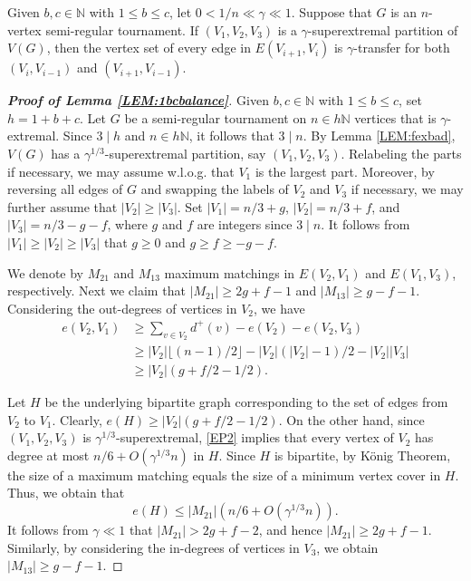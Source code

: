\documentclass[10pt,a4paper]{amsart}
\begin{document}
\begin{lemma}\label{LEM-edgegood}
    Given $b,c\in\mathbb{N}$ with $1\leqslant b\leqslant c$, let $0<1/n\ll\gamma\ll 1$. Suppose that $G$ is an $n$-vertex semi-regular tournament. If $(V_1,V_2,V_3)$ is a $\gamma$-superextremal partition of $V(G)$, then the vertex set of every edge in $E(V_{i+1},V_i)$ is $\gamma$-transfer for both $(V_i,V_{i-1})$ and $(V_{i+1},V_{i-1})$.
\end{lemma}

\begin{proof}[\textbf{Proof of Lemma \ref{LEM:1bcbalance}}] 
Given $b,c\in\mathbb{N}$ with $1\leqslant b\leqslant c$, set 
$h=1+b+c$. Let $G$ be a semi-regular tournament on $n\in h\mathbb{N}$ vertices that is $\gamma$-extremal. Since $3\mid h$ and $n\in h\mathbb{N}$, it follows that $3\mid n$. By Lemma \ref{LEM:fexbad}, $V(G)$ has a $\gamma^{1/3}$-superextremal partition, say $(V_1,V_2,V_3)$. Relabeling the parts if necessary, we may assume w.l.o.g. that $V_1$ is the largest part. Moreover, by reversing all edges of $G$ and swapping the labels of $V_2$ and $V_3$ if necessary, we may further assume that $|V_2|\geqslant |V_3|$. Set $|V_1|=n/3+g$, $|V_2|=n/3+f$, and $|V_3|=n/3-g-f$, where $g$ and $f$ are integers since $3\mid n$. It follows from $|V_1|\geqslant |V_2|\geqslant |V_3|$ that $g\geqslant 0$ and $g\geqslant f\geqslant -g-f$.

We denote by $M_{21}$ and $M_{13}$ maximum matchings in $E(V_2,V_1)$ and $E(V_1,V_3)$, respectively. Next we claim that $|M_{21}|\geqslant 2g+f-1$ and $|M_{13}|\geqslant g-f-1$. Considering the out-degrees of vertices in $V_2$, we have 
\begin{align*}
    e(V_2,V_1)&\geqslant \sum_{v\in V_2} d^+(v)-e(V_2)-e(V_2,V_3)\\
    &\geqslant |V_2|\lfloor (n-1)/2\rfloor-|V_2|(|V_2|-1)/2-|V_2||V_3|\\
    &\geqslant |V_2|(g+f/2-1/2).
\end{align*}

Let $H$ be the underlying bipartite graph corresponding to the set of edges from $V_2$ to $V_1$. Clearly, $e(H)\geqslant|V_2|(g+f/2-1/2)$. On the other hand, since $(V_1,V_2,V_3)$ is $\gamma^{1/3}$-superextremal, \ref{EP2} implies that every vertex of $V_2$ has degree at most $n/6 + O(\gamma^{1/3}n)$ in $H$. Since $H$ is bipartite, by K\"{o}nig Theorem, the size of a maximum matching equals the size of a minimum vertex cover in $H$. Thus, we obtain that
$$
e(H)\leqslant |M_{21}|(n/6 + O(\gamma^{1/3}n)).
$$
It follows from $\gamma\ll 1$ that $|M_{21}|>2g+f-2$, and hence $|M_{21}|\geqslant 2g+f-1$. Similarly, by considering the in-degrees of vertices in $V_3$, we obtain $|M_{13}|\geqslant g-f-1$.


\end{proof}
\end{document}
